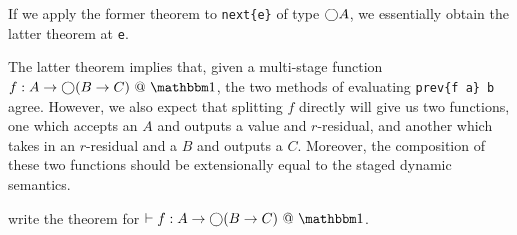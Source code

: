 If we apply the former theorem to \verb|next{e}| of type $\bigcirc A$, we
essentially obtain the latter theorem at \verb|e|.

The latter theorem implies that, given a multi-stage function $f:A\to\fut(B\to
C)~@~\bbone$, the two methods of evaluating \verb|prev{f a} b| agree.
However, we also expect that splitting $f$ directly will give us two functions,
one which accepts an $A$ and outputs a value and $r$-residual, and another which
takes in an $r$-residual and a $B$ and outputs a $C$. Moreover, the composition
of these two functions should be extensionally equal to the staged dynamic
semantics.

\TODO write the theorem for $\vdash f:A\to\fut(B\to C)~@~\bbone$.

%
%
%
%
